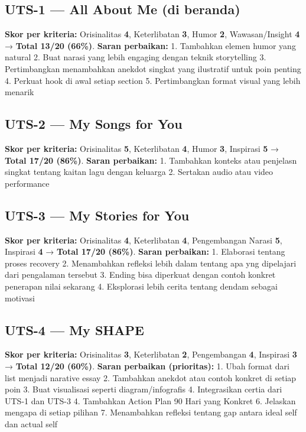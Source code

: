 \documentclass[
  letterpaper,
  DIV=11,
  numbers=noendperiod]{scrreprt}
\begin{document}
\subsection{UTS-1 --- All About Me (di
beranda)}\label{uts-1-all-about-me-di-beranda}

\textbf{Skor per kriteria:} Orisinalitas \textbf{4}, Keterlibatan
\textbf{3}, Humor \textbf{2}, Wawasan/Insight \textbf{4} → \textbf{Total
13/20 (66\%)}. \textbf{Saran perbaikan:} 1. Tambahkan elemen humor yang
natural 2. Buat narasi yang lebih engaging dengan teknik storytelling 3.
Pertimbangkan menambahkan anekdot singkat yang ilustratif untuk poin
penting 4. Perkuat hook di awal setiap section 5. Pertimbangkan format
visual yang lebih menarik

\subsection{UTS-2 --- My Songs for You}\label{uts-2-my-songs-for-you-1}

\textbf{Skor per kriteria:} Orisinalitas \textbf{5}, Keterlibatan
\textbf{4}, Humor \textbf{3}, Inspirasi \textbf{5} → \textbf{Total 17/20
(86\%)}. \textbf{Saran perbaikan:} 1. Tambahkan konteks atau penjelasn
singkat tentang kaitan lagu dengan keluarga 2. Sertakan audio atau video
performance

\subsection{UTS-3 --- My Stories for
You}\label{uts-3-my-stories-for-you-1}

\textbf{Skor per kriteria:} Orisinalitas \textbf{4}, Keterlibatan
\textbf{4}, Pengembangan Narasi \textbf{5}, Inspirasi \textbf{4} →
\textbf{Total 17/20 (86\%)}. \textbf{Saran perbaikan:} 1. Elaborasi
tentang proses recovery 2. Menambahkan refleksi lebih dalam tentang apa
yng dipelajari dari pengalaman tersebut 3. Ending bisa diperkuat dengan
contoh konkret penerapan nilai sekarang 4. Eksplorasi lebih cerita
tentang dendam sebagai motivasi

\subsection{UTS-4 --- My SHAPE}\label{uts-4-my-shape}

\textbf{Skor per kriteria:} Orisinalitas \textbf{3}, Keterlibatan
\textbf{2}, Pengembangan \textbf{4}, Inspirasi \textbf{3} →
\textbf{Total 12/20 (60\%)}. \textbf{Saran perbaikan (prioritas):} 1.
Ubah format dari list menjadi narative essay 2. Tambahkan anekdot atau
contoh konkret di setiap poin 3. Buat visualisasi seperti
diagram/infografis 4. Integrasikan certia dari UTS-1 dan UTS-3 4.
Tambahkan Action Plan 90 Hari yang Konkret 6. Jelaskan mengapa di setiap
pilihan 7. Menambahkan refleksi tentang gap antara ideal self dan actual
self
\end{document}
